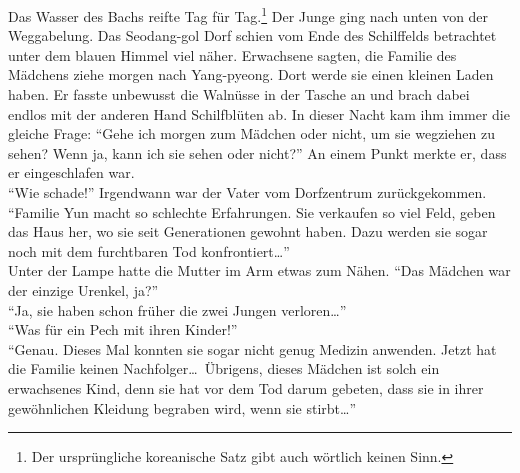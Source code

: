 \documentclass[prd,12pt,tightenlines,notitlepage,nofootinbib]{revtex4-1}
\begin{document}
Das Wasser des Bachs reifte Tag für Tag.\footnote{Der ursprüngliche
  koreanische Satz gibt auch wörtlich keinen Sinn.}
Der Junge ging nach unten von der Weggabelung.
Das Seodang-gol Dorf schien vom Ende des Schilffelds betrachtet
unter dem blauen Himmel viel näher.
Erwachsene sagten,
die Familie des Mädchens ziehe morgen nach Yang-pyeong.
Dort werde sie einen kleinen Laden haben.
Er fasste unbewusst die Walnüsse in der Tasche an und
brach dabei endlos mit der anderen Hand Schilfblüten ab.
In dieser Nacht kam ihm immer die gleiche Frage:
"`Gehe ich morgen zum Mädchen oder nicht, um sie wegziehen zu sehen?
Wenn ja, kann ich sie sehen oder nicht?"'
An einem Punkt merkte er, dass er eingeschlafen war.
\\ "`Wie schade!"'
Irgendwann war der Vater vom Dorfzentrum zurückgekommen.
"`Familie Yun macht so schlechte Erfahrungen.
Sie verkaufen so viel Feld,
geben das Haus her, wo sie seit Generationen gewohnt haben.
Dazu werden sie sogar noch mit dem furchtbaren Tod konfrontiert\ldots"'
\\ Unter der Lampe hatte die Mutter im Arm etwas zum Nähen.
"`Das Mädchen war der einzige Urenkel, ja?"'
\\ "`Ja, sie haben schon früher die zwei Jungen verloren\ldots"'
\\ "`Was für ein Pech mit ihren Kinder!"'
\\ "`Genau.
Dieses Mal konnten sie sogar nicht genug Medizin anwenden.
Jetzt hat die Familie keinen Nachfolger\ldots\
Übrigens, dieses Mädchen ist solch ein erwachsenes Kind,
denn sie hat vor dem Tod darum gebeten,
dass sie in ihrer gewöhnlichen Kleidung begraben wird,
wenn sie stirbt\ldots"'
\end{document}
